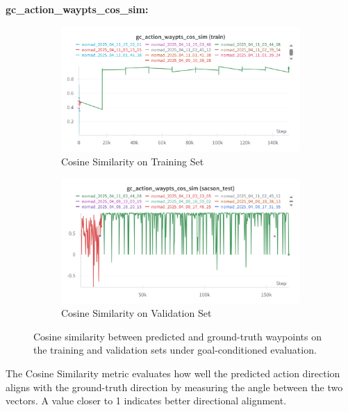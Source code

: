 \documentclass[12pt]{article}
\begin{document}
\noindent \textbf{gc\_action\_waypts\_cos\_sim:}\\
\begin{figure}[H]
    \centering
    \begin{subfigure}[b]{0.48\textwidth}
        \centering
        \includegraphics[width=\textwidth]{images/gc_action_waypts_cos_sim_train.png}
        \caption{Cosine Similarity on Training Set}
        \label{fig:gc_action_waypts_cos_sim_train}
    \end{subfigure}
    \hfill
    \begin{subfigure}[b]{0.48\textwidth}
        \centering
        \includegraphics[width=\textwidth]{images/gc_action_waypts_cos_sim_test.png}
        \caption{Cosine Similarity on Validation Set}
        \label{fig:gc_action_waypts_cos_sim_val}
    \end{subfigure}
    \caption{Cosine similarity between predicted and ground-truth waypoints on the training and validation sets under goal-conditioned evaluation.}
\end{figure}
The Cosine Similarity metric evaluates how well the predicted action direction aligns with the ground-truth direction by measuring the angle between the two vectors. A value closer to 1 indicates better directional alignment.
\end{document}
